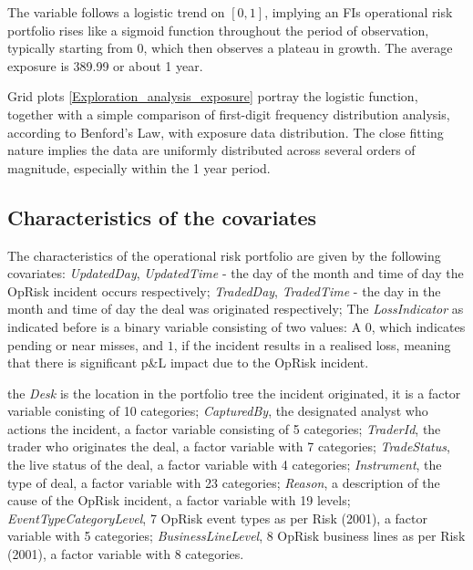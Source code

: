 \documentclass{DissertateUSU}
\begin{document}
The variable follows a logistic trend on \([0,1]\), implying an FIs
operational risk portfolio rises like a sigmoid function throughout the
period of observation, typically starting from \(0\), which then
observes a plateau in growth. The average exposure is 389.99 or about 1
year.\medskip

Grid plots \ref{Exploration_analysis_exposure} portray the logistic
function, together with a simple comparison of first-digit frequency
distribution analysis, according to Benford's Law, with exposure data
distribution. The close fitting nature implies the data are uniformly
distributed across several orders of magnitude, especially within the 1
year period.\medskip

\subsection{Characteristics of the covariates}

The characteristics of the operational risk portfolio are given by the
following covariates: \emph{UpdatedDay}, \emph{UpdatedTime} - the day of
the month and time of day the OpRisk incident occurs respectively;
\emph{TradedDay}, \emph{TradedTime} - the day in the month and time of
day the deal was originated respectively; The \emph{LossIndicator} as
indicated before is a binary variable consisting of two values: A \(0\),
which indicates pending or near misses, and \(1\), if the incident
results in a realised loss, meaning that there is significant p\&L
impact due to the OpRisk incident.\medskip

the \emph{Desk} is the location in the portfolio tree the incident
originated, it is a factor variable conisting of 10 categories;
\emph{CapturedBy}, the designated analyst who actions the incident, a
factor variable consisting of 5 categories; \emph{TraderId}, the trader
who originates the deal, a factor variable with 7 categories;
\emph{TradeStatus}, the live status of the deal, a factor variable with
4 categories; \emph{Instrument}, the type of deal, a factor variable
with 23 categories; \emph{Reason}, a description of the cause of the
OpRisk incident, a factor variable with 19 levels;
\emph{EventTypeCategoryLevel}, 7 OpRisk event types as per Risk (2001),
a factor variable with 5 categories; \emph{BusinessLineLevel}, 8 OpRisk
business lines as per Risk (2001), a factor variable with 8
categories.\medskip

\singlespacing

\doublespacing
\end{document}
